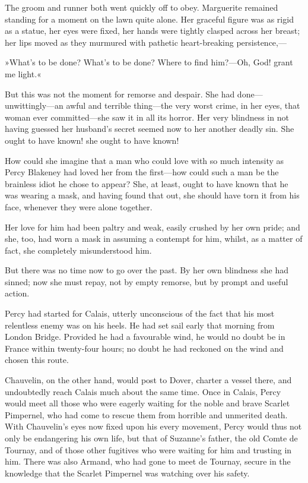 The groom and runner both went quickly off to obey. Marguerite remained standing for a moment on the lawn quite alone. Her graceful figure was as rigid as a statue, her eyes were fixed, her hands were tightly clasped across her breast; her lips moved as they murmured with pathetic heart-breaking persistence,—


»What's to be done? What's to be done? Where to find him?—Oh, God! grant me light.«

But this was not the moment for remorse and despair. She had done—unwittingly—an awful and terrible thing—the very worst crime, in her eyes, that woman ever  committed—she saw it in all its horror. Her very blindness in not having guessed her husband's secret seemed now to her another deadly sin. She ought to have known! she ought to have known!

How could she imagine that a man who could love with so much intensity as Percy Blakeney had loved her from the first—how could such a man be the brainless idiot he chose to appear? She, at least, ought to have known that he was wearing a mask, and having found that out, she should have torn it from his face, whenever they were alone together.

Her love for him had been paltry and weak, easily crushed by her own pride; and she, too, had worn a mask in assuming a contempt for him, whilst, as a matter of fact, she completely misunderstood him.

But there was no time now to go over the past. By her own blindness she had sinned; now she must repay, not by empty remorse, but by prompt and useful action.

Percy had started for Calais, utterly unconscious of the fact that his most relentless enemy was on his heels. He had set sail early that morning from London Bridge. Provided he had a favourable wind, he would no doubt be in France within twenty-four hours; no doubt he had reckoned on the wind and chosen this route.

Chauvelin, on the other hand, would post to Dover, charter a vessel there, and undoubtedly reach Calais much about the same time. Once in Calais, Percy would meet all those who were eagerly waiting for the noble and brave Scarlet Pimpernel, who had come to rescue them from horrible and unmerited death. With Chauvelin's eyes now fixed upon his every movement, Percy would thus not only be endangering his own life, but that of Suzanne's father, the old Comte de Tournay, and of those other fugitives who were waiting for him and trusting in him. There was also Armand, who had gone to meet de Tournay, secure in the knowledge that the Scarlet Pimpernel was watching over his safety.

